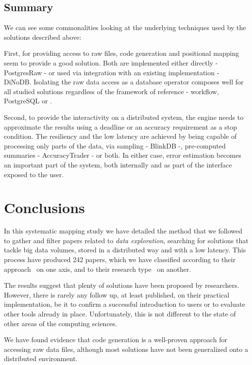 \subsection{Summary}
We can see some commonalities looking at the underlying techniques used by the 
solutions described above:

First, for providing access to raw files, code generation and positional 
mapping seem to provide a good solution. Both are implemented either directly - 
PostgresRaw - or used via integration with an existing implementation - DiNoDB. 
Isolating the raw data access as a database operator composes well for all 
studied solutions regardless of the framework of reference - workflow, 
PostgreSQL or \scidb.

Second, to provide the interactivity on a distributed system, the engine 
needs to approximate the results using a deadline or an accuracy requirement as 
a stop condition. The resiliency and the low latency are achieved by 
being capable of processing only parts of the data, via sampling - BlinkDB -, 
pre-computed summaries - AccuracyTrader - or both. In either case, error 
estimation becomes an important part of the system, both internally and as 
part of the interface exposed to the user.

\section{Conclusions}
\label{sec:conclusions}
In this systematic mapping study we have detailed the method that we followed
to gather and filter papers related to \emph{data exploration}, searching
for solutions that tackle big data volumes, stored in a distributed way and with
a low latency. This process have produced 242 papers, which we have classified
according to their approach~\cite{Idreos2015} on one axis, and to their research
type~\cite{Wieringa2006} on another.

The results suggest that  plenty of solutions have been proposed by researchers.
However, there is rarely any follow up, at least published, on their
practical implementation, be it to confirm a successful introduction to users
or to evaluate other tools already in place.
Unfortunately, this is not different to the state of other areas of the computing sciences.

We have found evidence that code generation is a well-proven approach for
accessing raw data files, although most solutions have not been generalized
onto a distributed environment.

